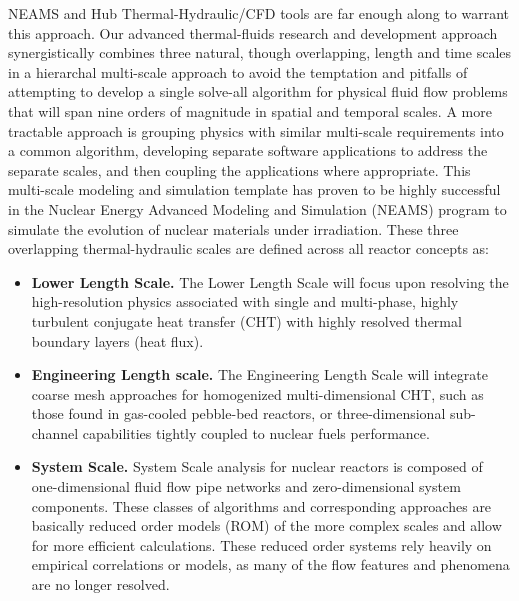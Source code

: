NEAMS and Hub Thermal-Hydraulic/CFD tools are far enough along to warrant this approach.
Our advanced thermal-fluids research and development approach synergistically combines three natural, though overlapping, length and time scales in a hierarchal multi-scale approach to avoid the temptation and pitfalls of attempting to develop a single solve-all algorithm for physical fluid flow problems that will span nine orders of magnitude in spatial and temporal scales.
A more tractable approach is grouping physics with similar multi-scale requirements into a common algorithm, developing separate software applications to address the separate scales, and then coupling the applications where appropriate.
This multi-scale modeling and simulation template has proven to be highly successful in the Nuclear Energy Advanced Modeling and Simulation (NEAMS) program to simulate the evolution of nuclear materials under irradiation.
These three overlapping thermal-hydraulic scales are defined across all reactor concepts as:
\begin{itemize}
    \item \textbf{Lower Length Scale.} The Lower Length Scale will focus upon resolving the high-resolution physics
    associated with single and multi-phase, highly turbulent conjugate heat transfer (CHT) with highly
    resolved thermal boundary layers (heat flux).
    \item \textbf{Engineering Length scale.} The Engineering Length Scale will integrate coarse mesh approaches
    for homogenized multi-dimensional CHT, such as those found in gas-cooled pebble-bed reactors, or three-dimensional sub-channel capabilities tightly coupled to nuclear fuels performance.
    \item \textbf{System Scale.} System Scale analysis for nuclear reactors is composed of one-dimensional fluid flow
    pipe networks and zero-dimensional system components.
These classes of algorithms and corresponding approaches are basically reduced order models (ROM) of the more complex scales and allow for more efficient calculations.
These reduced order systems rely heavily on empirical correlations or models, as many of the flow features and phenomena are no longer resolved.
\end{itemize}

